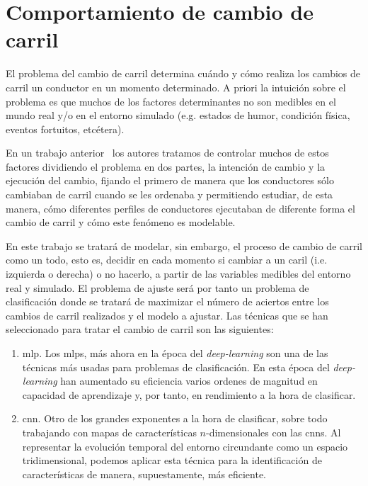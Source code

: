 \chapter{Comportamiento de cambio de carril}
\label{ch:lane-change-model}

El problema del cambio de carril determina cuándo y cómo realiza los cambios de carril un conductor en un momento determinado. A priori la intuición sobre el problema es que muchos de los factores determinantes no son medibles en el mundo real y/o en el entorno simulado (e.g. estados de humor, condición física, eventos fortuitos, etcétera).

En un trabajo anterior~\cite{CITA DEL ARTÍCULO DE LANE EXECUTION CUANDO NOS LO PUBLIQUEN} los autores tratamos de controlar muchos de estos factores dividiendo el problema en dos partes, la intención de cambio y la ejecución del cambio, fijando el primero de manera que los conductores sólo cambiaban de carril cuando se les ordenaba y permitiendo estudiar, de esta manera, cómo diferentes perfiles de conductores ejecutaban de diferente forma el cambio de carril y cómo este fenómeno es modelable.

En este trabajo se tratará de modelar, sin embargo, el proceso de cambio de carril como un todo, esto es, decidir en cada momento si cambiar a un caril (i.e. izquierda o derecha) o no hacerlo, a partir de las variables medibles del entorno real y simulado. El problema de ajuste será por tanto un problema de clasificación donde se tratará de maximizar el número de aciertos entre los cambios de carril realizados y el modelo a ajustar. Las técnicas que se han seleccionado para tratar el cambio de carril son las siguientes:

\begin{enumerate}
	\item \ac{mlp}. Los \acp{mlp}, más ahora en la época del \textit{deep-learning} son una de las técnicas más usadas para problemas de clasificación. En esta época del \textit{deep-learning} han aumentado su eficiencia varios ordenes de magnitud en capacidad de aprendizaje y, por tanto, en rendimiento a la hora de clasificar.
	\item \ac{cnn}. Otro de los grandes exponentes a la hora de clasificar, sobre todo trabajando con mapas de características $n$-dimensionales con las \acp{cnn}. Al representar la evolución temporal del entorno circundante como un espacio tridimensional, podemos aplicar esta técnica para la identificación de características de manera, supuestamente, más eficiente.
\end{enumerate}

